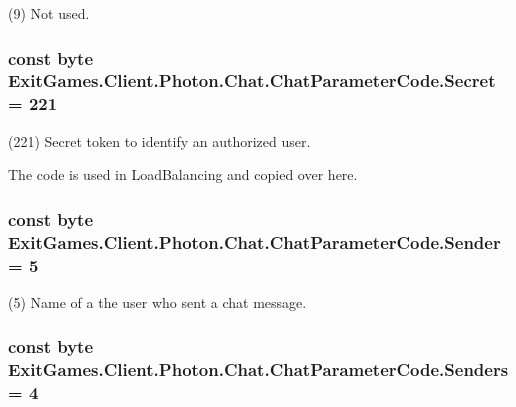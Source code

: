 (9) Not used.

\subsubsection[{\texorpdfstring{Secret}{Secret}}]{\setlength{\rightskip}{0pt plus 5cm}const byte Exit\+Games.\+Client.\+Photon.\+Chat.\+Chat\+Parameter\+Code.\+Secret = 221}\hypertarget{class_exit_games_1_1_client_1_1_photon_1_1_chat_1_1_chat_parameter_code_aaaeab778bcf9ca4da5add8112086e360}{}\label{class_exit_games_1_1_client_1_1_photon_1_1_chat_1_1_chat_parameter_code_aaaeab778bcf9ca4da5add8112086e360}


(221) Secret token to identify an authorized user.

The code is used in Load\+Balancing and copied over here.
\subsubsection[{\texorpdfstring{Sender}{Sender}}]{\setlength{\rightskip}{0pt plus 5cm}const byte Exit\+Games.\+Client.\+Photon.\+Chat.\+Chat\+Parameter\+Code.\+Sender = 5}\hypertarget{class_exit_games_1_1_client_1_1_photon_1_1_chat_1_1_chat_parameter_code_a7e8317fba9446f840f9f76af1ed77a05}{}\label{class_exit_games_1_1_client_1_1_photon_1_1_chat_1_1_chat_parameter_code_a7e8317fba9446f840f9f76af1ed77a05}


(5) Name of a the user who sent a chat message.

\subsubsection[{\texorpdfstring{Senders}{Senders}}]{\setlength{\rightskip}{0pt plus 5cm}const byte Exit\+Games.\+Client.\+Photon.\+Chat.\+Chat\+Parameter\+Code.\+Senders = 4}\hypertarget{class_exit_games_1_1_client_1_1_photon_1_1_chat_1_1_chat_parameter_code_af53fe36e56bbddcc7595ef9145c232f0}{}\label{class_exit_games_1_1_client_1_1_photon_1_1_chat_1_1_chat_parameter_code_af53fe36e56bbddcc7595ef9145c232f0}


